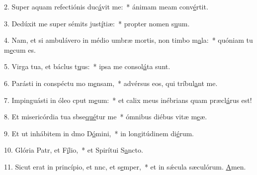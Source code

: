 2. Super aquam refectiónis duc\uline{á}vit me:~* ánimam meam conv\uline{é}rtit.\par 
3. Dedúxit me super sémits just\uline{í}tiæ:~* propter nomen s\uline{u}um.\par 
4. Nam, et si ambulávero in médio umbræ mortis, non timbo m\uline{a}la:~* quóniam tu m\uline{e}cum es.\par 
5. Virga tua, et báclus t\uline{u}us:~* ipsa me consol\uline{á}ta sunt.\par 
6. Parásti in conspéctu mo m\uline{e}nsam,~* advérsus eos, qui tríbul\uline{a}nt me.\par 
7. Impinguásti in óleo cput m\uline{e}um:~* et calix meus inébrians quam præcl\uline{á}rus est!\par 
8. Et misericórdia tua sbse\uline{qué}tur me~* ómnibus diébus vitæ m\uline{e}æ.\par 
9. Et ut inhábitem in dmo D\uline{ó}mini,~* in longitúdinem di\uline{é}rum.\par 
10. Glória Patr, et F\uline{í}lio,~* et Spirítui S\uline{a}ncto.\par 
11. Sicut erat in princípio, et nnc, et s\uline{e}mper,~* et in sǽcula sæculórum. \uline{A}men.\par 
